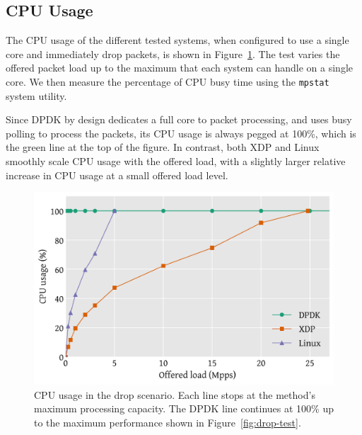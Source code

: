 \documentclass[10pt,sigconf,anonymous]{acmart}
\begin{document}
\subsection{CPU Usage}
\label{sec:cpu-usage}

The CPU usage of the different tested systems, when configured to use a single
core and immediately drop packets, is shown in Figure~\ref{fig:drop-cpu}. The
test varies the offered packet load up to the maximum that each system can
handle on a single core. We then measure the percentage of CPU busy time using
the \texttt{mpstat} system utility.

Since DPDK by design dedicates a full core to packet processing, and uses busy
polling to process the packets, its CPU usage is always pegged at 100\%, which
is the green line at the top of the figure. In contrast, both XDP and Linux
smoothly scale CPU usage with the offered load, with a slightly larger relative
increase in CPU usage at a small offered load level.

\begin{figure}[t]
\centering
\includegraphics[width=\linewidth]{figures/drop-cpu.pdf}
\caption{\label{fig:drop-cpu} CPU usage in the drop scenario. Each line stops at
  the method's maximum processing capacity. The DPDK line continues at 100\% up
  to the maximum performance shown in Figure~\ref{fig:drop-test}.}
\end{figure}
\end{document}
